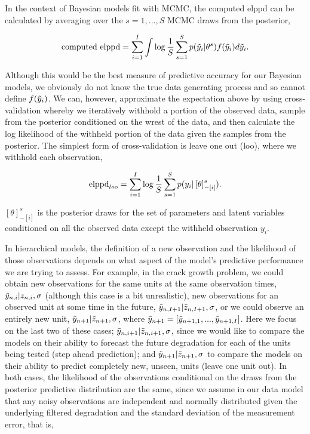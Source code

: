 In the context of Bayesian models fit with MCMC, the computed elppd can be calculated by averaging over the $s = 1, ..., S$ MCMC draws from the posterior,

\begin{equation} \label{ep:computed_elppd}
   \hbox{computed elppd} = \sum^I_{i = 1} \int \log \frac{1}{S} \sum^S_{s = 1} p(\Tilde{y}_i|\theta^s)f(\Tilde{y}_i) d\Tilde{y}_i.
\end{equation}

Although this would be the best measure of predictive accuracy for our Bayesian models, we obviously do not know the true data generating process and so cannot define $f(\Tilde{y}_i)$. We can, however, approximate the expectation above by using cross-validation whereby we iteratively withhold a portion of the observed data, sample from the posterior conditioned on the wrest of the data, and then calculate the log likelihood of the withheld portion of the data given the samples from the posterior. The simplest form of cross-validation is leave one out (loo), where we withhold each observation,

\begin{equation} \label{ep:elppd_loo}
   \hbox{elppd}_{loo} = \sum^I_{i = 1} \log \frac{1}{S} \sum^S_{s = 1} p(y_i|\left[\theta\right]_{-\left[i\right]}^s).
\end{equation}

$\left[\theta\right]_{-\left[i\right]}^s$ is the posterior draws for the set of parameters and latent variables conditioned on all the observed data except the withheld observation $y_i$.

In hierarchical models, the definition of a new observation and the likelihood of those observations depends on what aspect of the model's predictive performance we are trying to assess. For example, in the crack growth problem, we could obtain new observations for the same units at the same observation times, $\Tilde{y}_{n,i} | z_{n, i}, \sigma$ (although this case is a bit unrealistic), new observations for an observed unit at some time in the future, $\Tilde{y}_{n, I + 1}|\Tilde{z}_{n, I + 1}, \sigma$, or we could observe an entirely new unit, $\Tilde{y}_{n + 1}|\Tilde{z}_{n + 1}, \sigma$, where $\Tilde{y}_{n + 1} = \left[\Tilde{y}_{n + 1, 1}, ..., \Tilde{y}_{n + 1, I}\right]$. Here we focus on the last two of these cases; $\Tilde{y}_{n,i + 1}|\Tilde{z}_{n, i + 1}, \sigma$, since we would like to compare the models on their ability to forecast the future degradation for each of the units being tested (step ahead prediction); and $\Tilde{y}_{n + 1}|\Tilde{z}_{n + 1}, \sigma$ to compare the models on their ability to predict completely new, unseen, units (leave one unit out). In both cases, the likelihood of the observations conditional on the draws from the posterior predictive distribution are the same, since we assume in our data model that any noisy observations are independent and normally distributed given the underlying filtered degradation and the standard deviation of the measurement error, that is,

